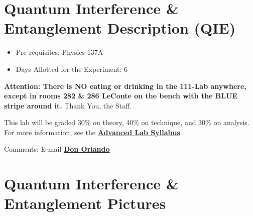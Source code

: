 \documentclass{../lab}
\begin{document}
\maketitle

\tableofcontents

\section{Quantum Interference \& Entanglement Description (QIE)}

\begin{itemize}
    \item Pre-requisites: Physics 137A

    \item Days Allotted for the Experiment: 6

\end{itemize}

\textbf{Attention: There is NO eating or drinking in the 111-Lab anywhere, except in rooms 282 \& 286 LeConte on the bench with the BLUE stripe around it.} Thank You, the Staff.

This lab will be graded 30\% on theory, 40\% on technique, and 30\% on analysis. For more information, see the \href{http://experimentationlab.berkeley.edu/syllabus}{\textbf{Advanced Lab Syllabus}}.

Comments: E-mail \href{\MailDonOrlando}{\textbf{Don Orlando}}

\section{Quantum Interference \& Entanglement Pictures}
\end{document}
